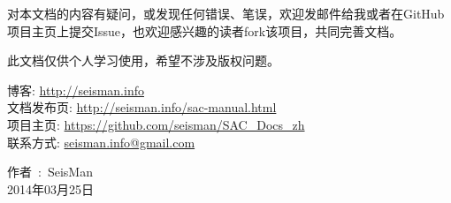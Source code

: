 对本文档的内容有疑问，或发现任何错误、笔误，欢迎发邮件给我或者在GitHub
项目主页上提交Issue，也欢迎感兴趣的读者fork该项目，共同完善文档。

此文档仅供个人学习使用，希望不涉及版权问题。

\begin{flushleft}
博客: \url{http://seisman.info}                                         \\
文档发布页: \url{http://seisman.info/sac-manual.html}                   \\
项目主页: \url{https://github.com/seisman/SAC_Docs_zh}                  \\
联系方式: \url{seisman.info@gmail.com}  
\end{flushleft}

\begin{flushright}
作者~:~SeisMan \\
2014年03月25日
\end{flushright}
